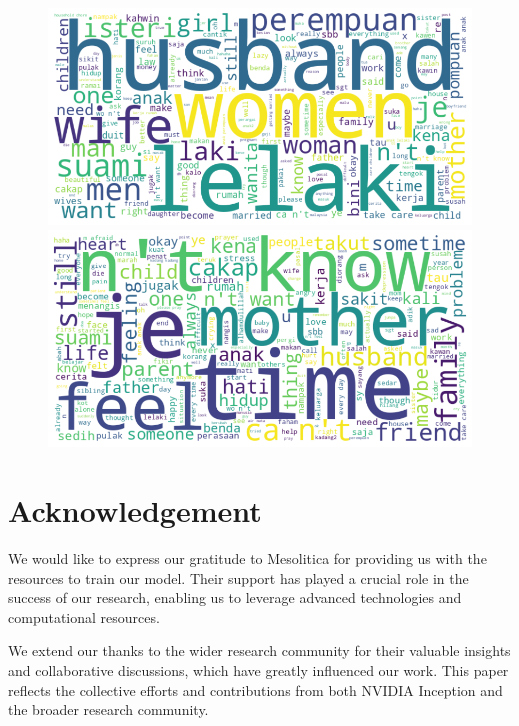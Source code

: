 \documentclass[preprint]{article}
\begin{document}
\begin{figure}[h]
  \centering
  \begin{minipage}[b]{0.45\textwidth}
    \centering
    \includegraphics[width=\linewidth]{img/sexist-wordcloud.png}
  \end{minipage}
  \hfill
  \begin{minipage}[b]{0.45\textwidth}
    \centering
    \includegraphics[width=\linewidth]{img/mental-wordcloud.png}
  \end{minipage}
\end{figure}

\section{Acknowledgement}

We would like to express our gratitude to Mesolitica for providing us with the resources to train our model. Their support has played a crucial role in the success of our research, enabling us to leverage advanced technologies and computational resources.

We extend our thanks to the wider research community for their valuable insights and collaborative discussions, which have greatly influenced our work. This paper reflects the collective efforts and contributions from both NVIDIA Inception and the broader research community.
\end{document}
